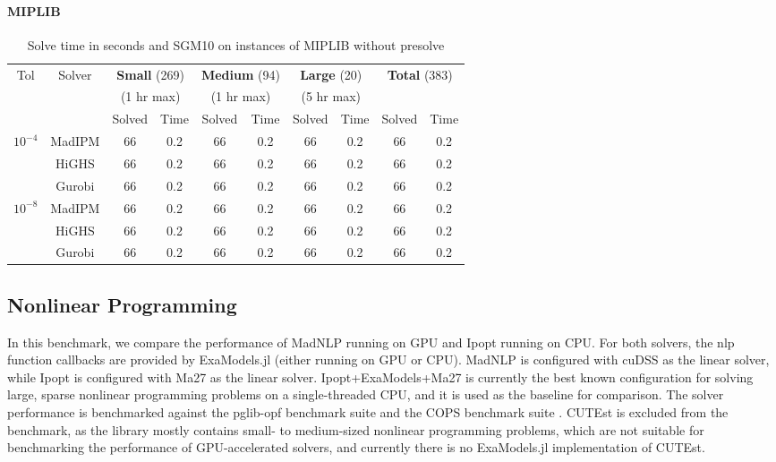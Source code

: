 \documentclass{article}
\begin{document}
\paragraph{MIPLIB}
\begin{table}[t]
  \centering\small
  \caption{Solve time in seconds and SGM10 on instances of MIPLIB without presolve}
  \begin{tabular}{|c|c|cc|cc|cc|cc|}
    \hline
    \multirow{ 3}{*}{Tol} & \multirow{ 3}{*}{Solver} & \multicolumn{2}{c|}{\textbf{Small} (269)}& \multicolumn{2}{c|}{\textbf{Medium} (94)}& \multicolumn{2}{c|}{\textbf{Large} (20)}& \multicolumn{2}{c|}{\multirow{2}{*}{\textbf{Total} (383)}}\\
                          && \multicolumn{2}{c|}{(1 hr max)}& \multicolumn{2}{c|}{(1 hr max)}& \multicolumn{2}{c|}{(5 hr max)}&&\\
                          &&  Solved & Time &  Solved & Time &  Solved & Time &  Solved & Time \\
    \hline
    \multirow{3}{*}{$10^{-4}$} & MadIPM & 66 & 0.2 & 66 & 0.2 & 66 & 0.2 & 66 & 0.2  \\
                          & HiGHS & 66 & 0.2 & 66 & 0.2 & 66 & 0.2 & 66 & 0.2 \\
                          & Gurobi & 66 & 0.2 & 66 & 0.2 & 66 & 0.2 & 66 & 0.2 \\
    \hline
    \multirow{3}{*}{$10^{-8}$} & MadIPM & 66 & 0.2 & 66 & 0.2 & 66 & 0.2& 66 & 0.2 \\
                          & HiGHS & 66 & 0.2 & 66 & 0.2 & 66 & 0.2& 66 & 0.2 \\
                          & Gurobi & 66 & 0.2 & 66 & 0.2 & 66 & 0.2& 66 & 0.2 \\
    \hline
  \end{tabular}  
\end{table}

\subsection{Nonlinear Programming}
In this benchmark, we compare the performance of MadNLP running on GPU and Ipopt running on CPU. For both solvers, the \gls*{nlp} function callbacks are provided by ExaModels.jl (either running on GPU or CPU). MadNLP is configured with cuDSS as the linear solver, while Ipopt is configured with Ma27 as the linear solver. Ipopt+ExaModels+Ma27 is currently the best known configuration for solving large, sparse nonlinear programming problems on a single-threaded CPU, and it is used as the baseline for comparison. The solver performance is benchmarked against the pglib-opf benchmark suite \cite{} and the COPS benchmark suite \cite{}. CUTEst \cite{} is excluded from the benchmark, as the library mostly contains small- to medium-sized nonlinear programming problems, which are not suitable for benchmarking the performance of GPU-accelerated solvers, and currently there is no ExaModels.jl implementation of CUTEst.
\end{document}
